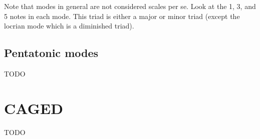 \clearpage

Note that modes in general are not considered scales per se. Look at the 1, 3, and 5 notes in each mode. This triad is either a major or minor triad (except the locrian mode which is a diminished triad).

\subsection{Pentatonic modes}
TODO

\section{CAGED}
TODO